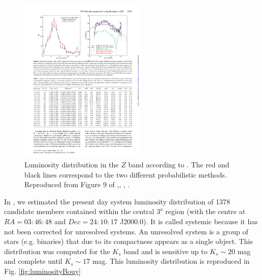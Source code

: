 \begin{figure}[ht!]
\begin{center}
\includegraphics[height=8cm]{background/Figures/F9_Lodieu2012.pdf}
\caption{Luminosity distribution  in the $Z$ band according to \citet{Lodieu2012}. The red and black lines correspond to the two different probabilistic methods.  Reproduced from Figure 9 of \citet{Lodieu2012},\textit{}, , .}
\label{fig:luminosityLodieu}
\end{center}
\end{figure}

In \citet{Bouy2015},  we estimated the present day system luminosity distribution of 1378 candidate members contained within the central $3^o$ region (with the centre at $RA=03:46:48$ and $Dec=24:10:17$ J2000.0). It is called systemic because it has not been corrected for unresolved systems. An unresolved system is a group of stars (e.g. binaries) that due to its compactness appears as a single object. This distribution was computed for the $K_s$ band and is sensitive up to $K_s \sim 20$ mag and complete until $K_s \sim 17$ mag. This luminosity distribution is reproduced in Fig. \ref{fig:luminosityBouy}


